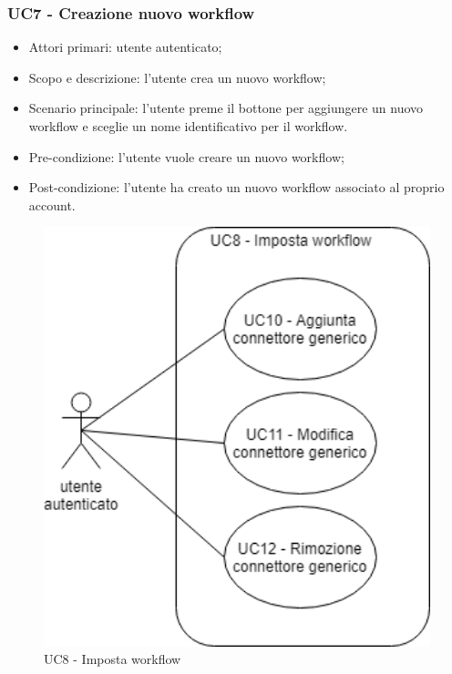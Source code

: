 \subsubsection{UC7 - Creazione nuovo workflow}
\begin{itemize}
	\item  Attori primari: utente autenticato;
	\item  Scopo e descrizione: l'utente crea un nuovo workflow;
	\item  Scenario principale: l'utente preme il bottone per aggiungere un nuovo workflow e sceglie un nome identificativo per il workflow.
	\item  Pre-condizione: l'utente vuole creare un nuovo workflow;
	\item  Post-condizione: l'utente ha creato un nuovo workflow associato al proprio account.
\end{itemize}

\begin{figure}[H]
	\centering
	\includegraphics[width=15cm,keepaspectratio]{../includes/pics/imposta_workflow.png}
	\caption{\label{fig:mission}UC8 - Imposta workflow}
\end{figure}

